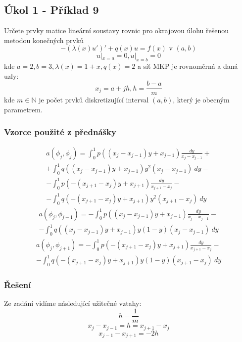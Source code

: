 \documentclass[../main.tex]{subfiles}
\begin{document}
\subsection{Úkol 1  - Příklad 9}
Určete prvky matice lineární soustavy rovnic pro okrajovou úlohu řešenou\\ metodou konečných prvků
\begin{equation}
    -(\lambda(x)u')' + q(x)u = f(x) \text{ v } (a,b)
\end{equation}
\begin{equation}
    u|_{x=a} = 0, u|_{x=b} = 0
\end{equation}
kde $a=2, b=3, \lambda(x) = 1+x, q(x)=2$ a síť MKP je rovnoměrná a daná uzly:
\begin{equation}
    x_j = a + jh, h=\frac{b-a}{m}
\end{equation}
kde $m\in \mathbb{N}$ je počet prvků diskretizující interval $(a,b)$, který je obecným parametrem.


\subsubsection{Vzorce použité z přednášky}
\begin{multline}\label{pr1:middle}
    a(\phi_j, \phi_j) = \int_0^1 p((x_j - x_{j-1})y + x_{j-1}) \frac{dy}{x_j - x_{j-1}} +\\+ \int_0^1 q((x_j - x_{j-1})y + x_{j-1}) y^2 (x_j - x_{j-1}) \ dy -\\- \int_0^1 p(-(x_{j+1} - x_j)y + x_{j+1}) \frac{dy}{ x_{j+1} - x_j} -\\- \int_0^1 q(-(x_{j+1} - x_j)y + x_{j+1}) y^2 (x_{j+1} - x_j) \ dy
\end{multline}
\begin{multline}\label{pr1:bellow}
    a(\phi_j, \phi_{j-1}) = - \int_0^1 p((x_j - x_{j-1})y + x_{j-1}) \frac{dy}{x_j - x_{j-1}} -\\- \int_0^1 q((x_j - x_{j-1})y + x_{j-1}) y(1-y) (x_j - x_{j-1}) \ dy
\end{multline}
\begin{multline}\label{pr1:above}
    a(\phi_j, \phi_{j+1}) = - \int_0^1 p(-(x_{j+1} - x_j)y + x_{j+1}) \frac{dy}{ x_{j+1} - x_j} -\\- \int_0^1 q(-(x_{j+1} - x_j)y + x_{j+1}) y(1-y) (x_{j+1} - x_j) \ dy
\end{multline}


\subsubsection{Řešení}
Ze zadání vidíme následující užitečné vztahy:
\begin{equation}\label{pr1:vztahhm}
    h=\frac{1}{m}
\end{equation}
\begin{equation}\label{pr1:h}
    x_j - x_{j-1} = h = x_{j+1} - x_j
\end{equation}
\begin{equation}\label{pr1:-2h}
    x_{j-1}- x_{j+1} = -2h
\end{equation}
\end{document}
